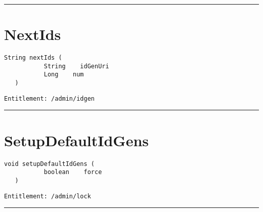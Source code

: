\rule{12cm}{2pt}
\section{NextIds}
\label{Api:NextIds}
\begin{lstlisting}[style=nonumbers]
   String nextIds (
           String    idGenUri
           Long    num
   )
\end{lstlisting}
\begin{Verbatim}[formatcom=\color{Maroon}]
  Entitlement: /admin/idgen
\end{Verbatim}



\rule{12cm}{2pt}
\section{SetupDefaultIdGens}
\label{Api:SetupDefaultIdGens}
\begin{lstlisting}[style=nonumbers]
   void setupDefaultIdGens (
           boolean    force
   )
\end{lstlisting}
\begin{Verbatim}[formatcom=\color{Maroon}]
  Entitlement: /admin/lock
\end{Verbatim}



\rule{12cm}{2pt}
